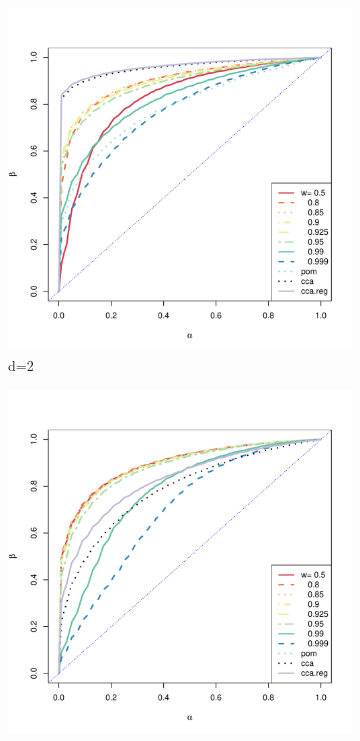 \documentclass[12pt,oneside,final]{thesis}\usepackage[]{graphicx}\usepackage[]{color}
\begin{document}
\begin{figure}
 \centering
  \captionsetup[subfigure]{labelformat=empty}
        \begin{subfigure}[b]{0.5\textwidth}        
               \centerline{\includegraphics[width=\textwidth]{ROC-d-2.pdf}}
                \caption{d=2}
                \label{fig:ROC-d-2}
        \end{subfigure}%
        \begin{subfigure}[b]{0.5\textwidth}           
                  \centerline{\includegraphics[width=\textwidth]{ROC-d-5.pdf}}

\end{subfigure}
\end{figure}
\end{document}
